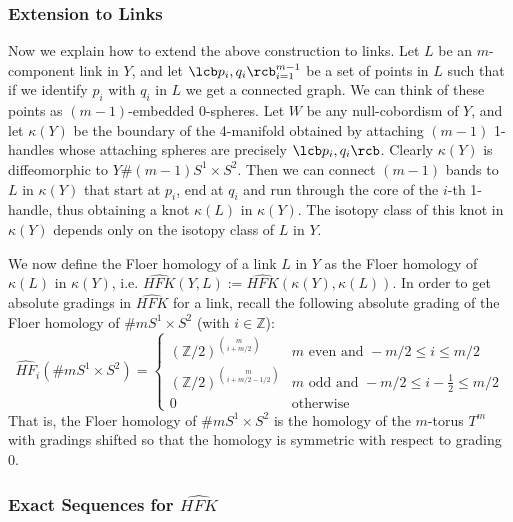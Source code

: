 \subsubsection{Extension to Links}

Now we explain how to extend the above construction to links. Let $L$ be an $m$-component link in $Y$, and let $\lcb p_i,q_i \rcb_{i=1}^{m-1}$ be a set of points in $L$ such that if we identify $p_i$ with $q_i$ in $L$ we get a connected graph. We can think of these points as $(m-1)$-embedded 0-spheres. Let $W$ be any null-cobordism of $Y$, and let $\kappa(Y)$ be the boundary of the 4-manifold obtained by attaching $(m-1)$ 1-handles whose attaching spheres are precisely $\lcb p_i,q_i \rcb$. Clearly $\kappa(Y)$ is diffeomorphic to $Y \# (m-1) S^1 \times S^2$. Then we can connect $(m-1)$ bands to $L$ in $\kappa(Y)$ that start at $p_i$, end at $q_i$ and run through the core of the $i$-th 1-handle, thus obtaining a knot $\kappa(L)$ in $\kappa(Y)$. The isotopy class of this knot in $\kappa(Y)$ depends only on the isotopy class of $L$ in $Y$.

We now define the Floer homology of a link $L$ in $Y$ as the Floer homology of $\kappa(L)$ in $\kappa(Y)$, i.e. $\widehat{HFK}(Y,L) := \widehat{HFK}(\kappa(Y),\kappa(L))$. In order to get absolute gradings in $\widehat{HFK}$ for a link, recall the following absolute grading of the Floer homology of $\#m S^1 \times S^2$ (with $i \in \mathbb Z$):
\[ \widehat{HF}_i(\#m S^1 \times S^2) = \begin{cases} (\mathbb Z/2)^{\binom{m}{i+m/2}} & m \text{ even and } -m/2 \leq i \leq m/2 \\ (\mathbb Z/2)^{\binom{m}{i+m/2-1/2}} & m \text{ odd and } -m/2 \leq i-\frac{1}{2} \leq m/2 \\ 0 & \text{otherwise} \end{cases} \]
That is, the Floer homology of $\# m S^1 \times S^2$ is the homology of the $m$-torus $T^m$ with gradings shifted so that the homology is symmetric with respect to grading 0.











\subsubsection{Exact Sequences for $\widehat{HFK}$}


